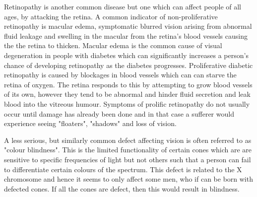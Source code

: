 Retinopathy is another common disease but one which can affect people of
all ages, by attacking the retina. A common indicator of non-proliferative
retinopathy is macular edema, symptomatic blurred vision arising from
abnormal fluid leakage and swelling in the macular from the retina's
blood vessels causing the the retina to thicken.\cite{hee1995quantitative}
Macular edema is the common cause of visual degeneration in people with
diabetes which can significantly increases a person's chance of developing
retinopathy as the diabetes progresses.\cite{klein1984wisconsin} Proliferative
diabetic retinopathy is caused by blockages in blood vessels which can can
starve the retina of oxygen. The retina responds to this by attempting to
grow blood vessels of its own, however they tend to be abnormal and hinder
fluid secretion and leak blood into the vitreous humour. Symptoms of
prolific retinopathy do not usually occur until damage has already been
done and in that case a sufferer would experience seeing "floaters",
"shadows" and loss of vision.

A less serious, but similarly common defect affecting vision is often referred
to as "colour blindness". This is the limited functionality of certain cones which
are are sensitive to specific frequencies of light but not others such that
a person can fail to differentiate certain colours of the spectrum.
This defect is related to the X chromosome and hence it seems to only affect some men,
who if can be born with defected cones.\cite{george1996clinical} If all
the cones are defect, then this would result in blindness.

